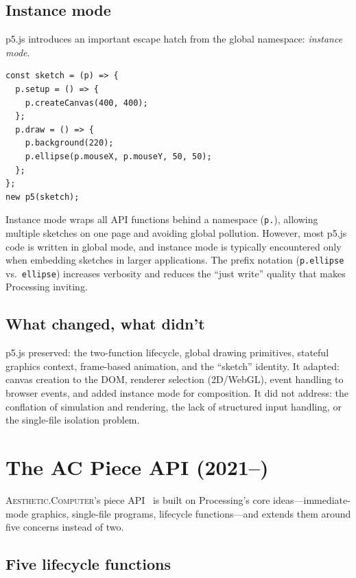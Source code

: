 \documentclass[10pt,letterpaper,twocolumn]{article}
\newcommand{\ac}{\textsc{Aesthetic.Computer}}
\begin{document}
\subsection{Instance mode}

p5.js introduces an important escape hatch from the global namespace: \emph{instance mode}.

\begin{lstlisting}[style=p5style,caption={p5.js instance mode.}]
const sketch = (p) => {
  p.setup = () => {
    p.createCanvas(400, 400);
  };
  p.draw = () => {
    p.background(220);
    p.ellipse(p.mouseX, p.mouseY, 50, 50);
  };
};
new p5(sketch);
\end{lstlisting}

Instance mode wraps all API functions behind a namespace (\texttt{p.}), allowing multiple sketches on one page and avoiding global pollution. However, most p5.js code is written in global mode, and instance mode is typically encountered only when embedding sketches in larger applications. The prefix notation (\texttt{p.ellipse} vs.\ \texttt{ellipse}) increases verbosity and reduces the ``just write'' quality that makes Processing inviting.

\subsection{What changed, what didn't}

p5.js preserved: the two-function lifecycle, global drawing primitives, stateful graphics context, frame-based animation, and the ``sketch'' identity. It adapted: canvas creation to the DOM, renderer selection (2D/WebGL), event handling to browser events, and added instance mode for composition. It did not address: the conflation of simulation and rendering, the lack of structured input handling, or the single-file isolation problem.


\section{The AC Piece API (2021--)}
\label{sec:ac}

\ac{}'s piece API~\citep{scudder2026ac} is built on Processing's core ideas---immediate-mode graphics, single-file programs, lifecycle functions---and extends them around five concerns instead of two.

\subsection{Five lifecycle functions}
\end{document}
